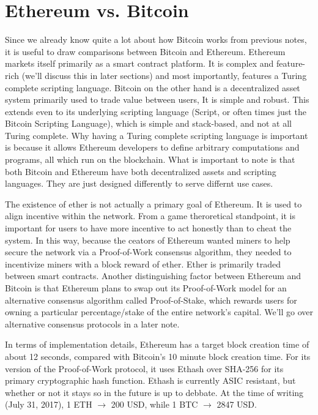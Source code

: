 \documentclass[full.tex]{subfiles}
\begin{document}
    \section*{Ethereum vs. Bitcoin}
    
    Since we already know quite a lot about how Bitcoin works from previous notes, it is useful to draw comparisons between Bitcoin and Ethereum. Ethereum markets itself primarily as a smart contract platform. It is complex and feature-rich (we'll discuss this in later sections) and most importantly, features a Turing complete scripting language. Bitcoin on the other hand is a decentralized asset system primarily used to trade value between users, It is simple and robust. This extends even to its underlying scripting language (Script, or often times just the Bitcoin Scripting Language), which is simple and stack-based, and not at all Turing complete. Why having a Turing complete scripting language is important is because it allows Ethereum developers to define arbitrary computations and programs, all which run on the blockchain. What is important to note is that both Bitcoin and Ethereum have both decentralized assets and scripting languages. They are just designed differently to serve differnt use cases.
    
    The existence of ether is not actually a primary goal of Ethereum. It is used to align incentive within the network. From a game theroretical standpoint, it is important for users to have more incentive to act honestly than to cheat the system. In this way, because the ceators of Ethereum wanted miners to help secure the network via a Proof-of-Work consensus algorithm, they needed to incentivize miners with a block reward of ether. Ether is primarily traded between smart contracts. Another distinguishing factor between Ethereum and Bitcoin is that Ethereum plans to swap out its Proof-of-Work model for an alternative consensus algorithm called Proof-of-Stake, which rewards users for owning a particular percentage/stake of the entire network's capital. We'll go over alternative consensus protocols in a later note.
    
    In terms of implementation details, Ethereum has a target block creation time of about 12 seconds, compared with Bitcoin's 10 minute block creation time. For its version of the Proof-of-Work protocol, it uses Ethash over SHA-256 for its primary cryptographic hash function. Ethash is currently ASIC resistant, but whether or not it stays so in the future is up to debbate. At the time of writing (July 31, 2017), 1 ETH $\rightarrow$ 200 USD, while 1 BTC $\rightarrow$ 2847 USD.
    
\end{document}
